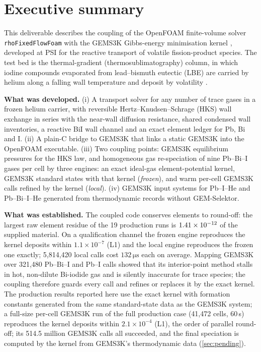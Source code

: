 \documentclass[11pt,a4paper]{article}
\newcommand{\units}[1]{\,\mathrm{#1}}
\begin{document}
\section*{Executive summary}

This deliverable describes the coupling of the OpenFOAM finite-volume
solver \texttt{rhoFixedFlowFoam} with the GEMS3K Gibbs-energy
minimisation kernel \cite{Kulik2013gemselektor}, developed at PSI for
the reactive transport of volatile fission-product species. The test
bed is the thermal-gradient (thermosublimatography) column, in which
iodine compounds evaporated from lead--bismuth eutectic (LBE) are carried
by helium along a falling wall temperature and deposit by volatility
\cite{Liu2025chemical,Lobresco2026assessment}.

\textbf{What was developed.} (i) A transport solver for any number of
trace gases in a frozen helium carrier, with reversible
Hertz--Knudsen--Schrage (HKS) wall exchange in series with the near-wall
diffusion resistance, shared condensed wall inventories, a reactive
BiI wall channel and an exact element ledger for Pb, Bi and I. (ii) A
plain-C bridge to GEMS3K that links a static GEMS3K into the OpenFOAM
executable. (iii) Two coupling points: GEMS3K equilibrium pressures for
the HKS law, and homogeneous gas re-speciation of nine Pb--Bi--I gases
per cell by three engines: an exact ideal-gas element-potential kernel,
GEMS3K standard states with that kernel (\emph{frozen}), and warm
per-cell GEMS3K calls refined by the kernel (\emph{local}). (iv)
GEMS3K input systems for Pb--I--He and Pb--Bi--I--He generated from
thermodynamic records without GEM-Selektor.

\textbf{What was established.} The coupled code conserves elements to
round-off: the largest raw element residue of the 19 production runs is
$1.41\times10^{-12}$ of the supplied material. On a qualification channel
the frozen engine reproduces the kernel deposits within
$1.1\times10^{-7}$ (L1) and the local engine reproduces the frozen one
exactly; 5,814,420 local calls cost $132\units{\mu s}$ each on average.
Mapping GEMS3K over 321,480 Pb--Bi--I and Pb--I calls showed that its interior-point
method stalls in hot, non-dilute Bi-iodide gas and is silently
inaccurate for trace species; the coupling therefore guards every call and
refines or replaces it by the exact kernel. The production results
reported here use the exact kernel with formation constants generated
from the same standard-state data as the GEMS3K system; a full-size
per-cell GEMS3K run of the full production case (41,472 cells, 60\,s)
reproduces the kernel deposits within $2.1\times10^{-4}$ (L1), the order
of parallel round-off; its 514.5 million GEMS3K calls all succeeded, and
the final speciation is computed by the kernel from GEMS3K's
thermodynamic data (\cref{sec:pending}).
\end{document}
